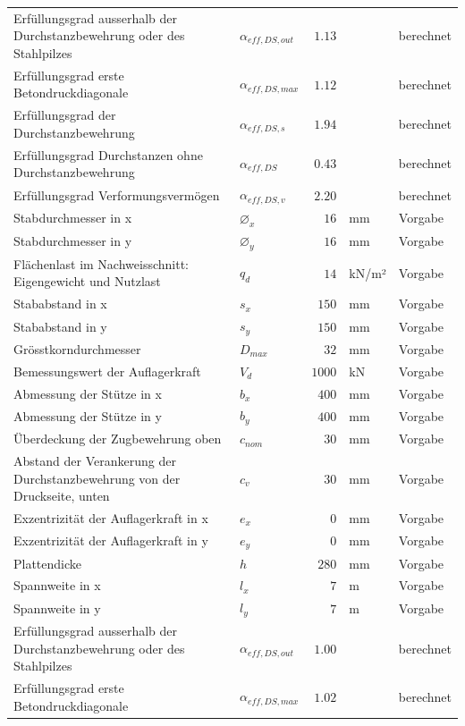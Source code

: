 \documentclass[11pt,a4paper]{article}
\begin{document}
\begin{xltabular}{\linewidth}{>{\raggedright\arraybackslash}Xlrll}
Erfüllungsgrad ausserhalb der Durchstanzbewehrung oder des Stahlpilzes & $\alpha_{eff,DS,out}$ & $1.13$ &  & berechnet \\
Erfüllungsgrad erste Betondruckdiagonale & $\alpha_{eff,DS,max}$ & $1.12$ &  & berechnet \\
Erfüllungsgrad der Durchstanzbewehrung & $\alpha_{eff,DS,s}$ & $1.94$ &  & berechnet \\
Erfüllungsgrad Durchstanzen ohne Durchstanzbewehrung & $\alpha_{eff,DS}$ & $0.43$ &  & berechnet \\
Erfüllungsgrad Verformungsvermögen & $\alpha_{eff,DS,v}$ & $2.20$ &  & berechnet \\
Stabdurchmesser in x & $\varnothing_x$ & $16$ & mm & Vorgabe \\
Stabdurchmesser in y & $\varnothing_y$ & $16$ & mm & Vorgabe \\
Flächenlast im Nachweisschnitt: Eigengewicht und Nutzlast & $q_d$ & $14$ & kN/m² & Vorgabe \\
Stababstand in x & $s_x$ & $150$ & mm & Vorgabe \\
Stababstand in y & $s_y$ & $150$ & mm & Vorgabe \\
Grösstkorndurchmesser & $D_{max}$ & $32$ & mm & Vorgabe \\
Bemessungswert der Auflagerkraft & $V_d$ & $1000$ & kN & Vorgabe \\
Abmessung der Stütze in x & $b_x$ & $400$ & mm & Vorgabe \\
Abmessung der Stütze in y & $b_y$ & $400$ & mm & Vorgabe \\
Überdeckung der Zugbewehrung oben & $c_{nom}$ & $30$ & mm & Vorgabe \\
Abstand der Verankerung der Durchstanzbewehrung von der Druckseite, unten & $c_v$ & $30$ & mm & Vorgabe \\
Exzentrizität der Auflagerkraft in x & $e_x$ & $0$ & mm & Vorgabe \\
Exzentrizität der Auflagerkraft in y & $e_y$ & $0$ & mm & Vorgabe \\
Plattendicke & $h$ & $280$ & mm & Vorgabe \\
Spannweite in x & $l_x$ & $7$ & m & Vorgabe \\
Spannweite in y & $l_y$ & $7$ & m & Vorgabe \\
Erfüllungsgrad ausserhalb der Durchstanzbewehrung oder des Stahlpilzes & $\alpha_{eff,DS,out}$ & $1.00$ &  & berechnet \\
Erfüllungsgrad erste Betondruckdiagonale & $\alpha_{eff,DS,max}$ & $1.02$ &  & berechnet \\

\end{xltabular}
\end{document}
